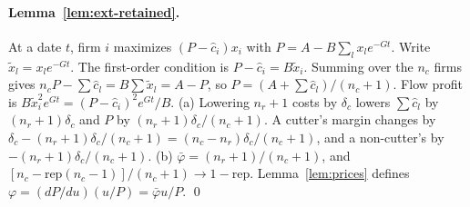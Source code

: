\paragraph{Lemma~\ref{lem:ext-retained}.} At a date $t$, firm $i$ maximizes $(P-\hat c_i)x_i$ with $P=A-B\sum_lx_le^{-Gt}$. Write $\tilde x_l=x_le^{-Gt}$. The first-order condition is $P-\hat c_i=B\tilde x_i$. Summing over the $n_c$ firms gives $n_cP-\sum\hat c_l=B\sum\tilde x_l=A-P$, so $P=(A+\sum\hat c_l)/(n_c+1)$. Flow profit is $B\tilde x_i^2e^{Gt}=(P-\hat c_i)^2e^{Gt}/B$. (a) Lowering $n_r+1$ costs by $\delta_c$ lowers $\sum\hat c_l$ by $(n_r+1)\delta_c$ and $P$ by $(n_r+1)\delta_c/(n_c+1)$. A cutter's margin changes by $\delta_c-(n_r+1)\delta_c/(n_c+1)=(n_c-n_r)\delta_c/(n_c+1)$, and a non-cutter's by $-(n_r+1)\delta_c/(n_c+1)$. (b) $\bar\varphi=(n_r+1)/(n_c+1)$, and $[n_c-\mathrm{rep}(n_c-1)]/(n_c+1)\to1-\mathrm{rep}$. Lemma~\ref{lem:prices} defines $\varphi=(dP/du)(u/P)=\bar\varphi u/P$. \qed

